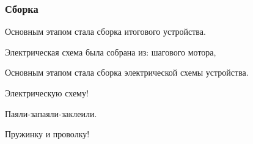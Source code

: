 \subsubsection{Сборка}

Основным этапом стала сборка итогового устройства.

Электрическая схема была собрана из: шагового мотора,





Основным этапом стала сборка электрической схемы устройства. 

Электрическую схему!

Паяли-запаяли-заклеили. 

Пружинку и проволку!

